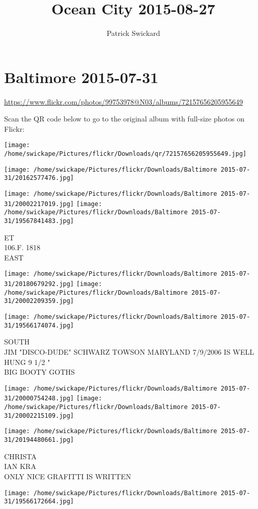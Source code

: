\documentclass[10pt,letterpaper]{article}
\title{Ocean City 2015-08-27}
\author{Patrick Swickard}
\date{}
\begin{document}
\section*{Baltimore 2015-07-31}

\url{https://www.flickr.com/photos/99753978@N03/albums/72157656205955649}

Scan the QR code below to go to the original album with full-size photos on Flickr:

\texttt{[image: /home/swickape/Pictures/flickr/Downloads/qr/72157656205955649.jpg]}
\pagebreak

\texttt{[image: /home/swickape/Pictures/flickr/Downloads/Baltimore 2015-07-31/20162577476.jpg]}

\vspace{0.25in}
\texttt{[image: /home/swickape/Pictures/flickr/Downloads/Baltimore 2015-07-31/20002217019.jpg]}
\texttt{[image: /home/swickape/Pictures/flickr/Downloads/Baltimore 2015-07-31/19567841483.jpg]}

ET\\
106.F. 1818\\
EAST
\pagebreak

\texttt{[image: /home/swickape/Pictures/flickr/Downloads/Baltimore 2015-07-31/20180679292.jpg]}
\texttt{[image: /home/swickape/Pictures/flickr/Downloads/Baltimore 2015-07-31/20002209359.jpg]}

\vspace{0.25in}
\texttt{[image: /home/swickape/Pictures/flickr/Downloads/Baltimore 2015-07-31/19566174074.jpg]}

SOUTH\\
JIM "DISCO{-}DUDE" SCHWARZ TOWSON MARYLAND 7/9/2006 IS WELL HUNG 9 1/2 "\\
BIG BOOTY GOTHS
\pagebreak

\texttt{[image: /home/swickape/Pictures/flickr/Downloads/Baltimore 2015-07-31/20000754248.jpg]}
\texttt{[image: /home/swickape/Pictures/flickr/Downloads/Baltimore 2015-07-31/20002215109.jpg]}

\texttt{[image: /home/swickape/Pictures/flickr/Downloads/Baltimore 2015-07-31/20194480661.jpg]}

CHRISTA\\
IAN KRA\\
ONLY NICE GRAFITTI IS WRITTEN
\pagebreak

\texttt{[image: /home/swickape/Pictures/flickr/Downloads/Baltimore 2015-07-31/19566172664.jpg]}
\end{document}
